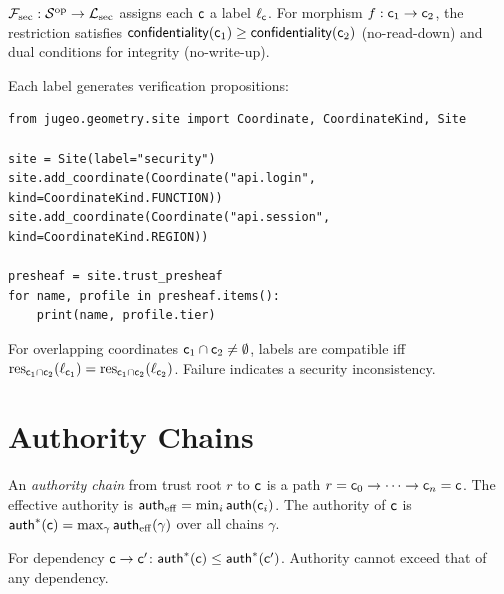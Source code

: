 \documentclass[11pt]{article}
\newcommand{\AuthLevel}{\mathsf{auth}}
\newcommand{\Confid}{\mathsf{confidentiality}}
\newcommand{\SecSheaf}{\mathcal{F}_{\mathrm{sec}}}
\begin{document}
\begin{definition}\label{def:sec-presheaf}
$\SecSheaf : \Site^{\mathrm{op}} \to \mathcal{L}_{\mathrm{sec}}$
assigns each $\mathsf{c}$ a label $\ell_{\mathsf{c}}$.  For morphism
$f : \mathsf{c}_1 \to \mathsf{c}_2$, the restriction satisfies
$\Confid(\coord_1) \geq \Confid(\coord_2)$ (no-read-down) and
dual conditions for integrity (no-write-up).
\end{definition}

Each label generates verification propositions:

\begin{lstlisting}[style=jugeo-python]
from jugeo.geometry.site import Coordinate, CoordinateKind, Site

site = Site(label="security")
site.add_coordinate(Coordinate("api.login", kind=CoordinateKind.FUNCTION))
site.add_coordinate(Coordinate("api.session", kind=CoordinateKind.REGION))

presheaf = site.trust_presheaf
for name, profile in presheaf.items():
    print(name, profile.tier)
\end{lstlisting}

\begin{proposition}\label{prop:sec-compat}
For overlapping coordinates $\mathsf{c}_1 \cap \mathsf{c}_2 \neq \emptyset$,
labels are compatible iff $\mathrm{res}_{\mathsf{c}_1 \cap \mathsf{c}_2}(\ell_{\mathsf{c}_1})
= \mathrm{res}_{\mathsf{c}_1 \cap \mathsf{c}_2}(\ell_{\mathsf{c}_2})$.  Failure indicates
a security inconsistency.
\end{proposition}

\section{Authority Chains}\label{sec:authority-chains}

\begin{definition}\label{def:auth-chain}
An \emph{authority chain} from trust root $r$ to $\mathsf{c}$ is a path
$r = \mathsf{c}_0 \to \cdots \to \mathsf{c}_n = \mathsf{c}$.  The effective
authority is $\AuthLevel_{\mathrm{eff}} = \min_{i} \AuthLevel(\coord_i)$.
The authority of $\mathsf{c}$ is $\AuthLevel^*(\coord) = \max_{\gamma}
\AuthLevel_{\mathrm{eff}}(\gamma)$ over all chains $\gamma$.
\end{definition}

\begin{theorem}\label{thm:auth-bound}
For dependency $\mathsf{c} \to \mathsf{c}'$:
$\AuthLevel^*(\coord) \leq \AuthLevel^*(\coord')$.
Authority cannot exceed that of any dependency.
\end{theorem}
\end{document}
